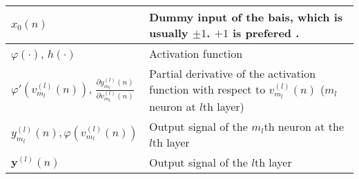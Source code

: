 \begin{xltabular}{\textwidth}{XX}
	\(x_0(n)\)                                                                                                                                                                     & Dummy input of the bais, which is usually \(\pm 1\). \(+1\) is prefered \cite{bishopPatternRecognitionMachine2006,haykinNeuralNetworksLearning2009}.                                                                                                                                                                                   \\ \hline
	\(\varphi(\cdot)\)\cite{haykinNeuralNetworksLearning2009}, \(h(\cdot)\)\cite{bishopPatternRecognitionMachine2006}                                                              & Activation function                                                                                                                                                                                                                                                                                                                    \\ \hline
	\(\varphi'(v_{m_l}^{(l)}(n))\)\cite{haykinNeuralNetworksLearning2009}, \(\frac{\partial y_{m_l}^{(l)}(n)}{\partial v_{m_l}^{(l)}(n)}\) \cite{haykinNeuralNetworksLearning2009} & Partial derivative of the activation function with respect to \(v_{m_l}^{(l)}(n)\) (\(m_l\) neuron at \(l\)th layer)                                                                                                                                                                                                                   \\ \hline
	\(y_{m_l}^{(l)}(n), \varphi \left( v_{m_l}^{(l)}(n) \right)\)                                                                                                                  & Output signal of the \(m_l\)th neuron at the \(l\)th layer                                                                                                                                                                                                                                                                             \\ \hline
	\(\mathbf{y}^{(l)}(n)\)                                                                                                                                                        & Output signal of the \(l\)th layer                                                                                                                                                                                                                                                                                                     \\ \hline

\end{xltabular}
